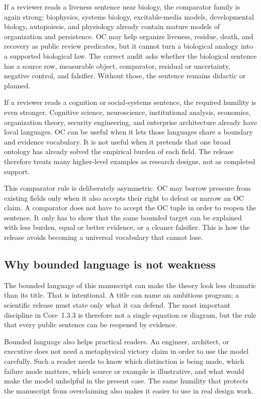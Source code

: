 If a reviewer reads a liveness sentence near biology, the comparator family is
again strong: biophysics, systems biology, excitable-media models,
developmental biology, autopoiesis, and physiology already contain mature
models of organization and persistence. OC may help organize liveness,
residue, death, and recovery as public review predicates, but it cannot turn a
biological analogy into a supported biological law. The correct audit asks
whether the biological sentence has a source row, measurable object,
comparator, residual or uncertainty, negative control, and falsifier. Without
those, the sentence remains didactic or planned.

If a reviewer reads a cognition or social-systems sentence, the required
humility is even stronger. Cognitive science, neuroscience, institutional
analysis, economics, organization theory, security engineering, and enterprise
architecture already have local languages. OC can be useful when it lets those
languages share a boundary and evidence vocabulary. It is not useful when it
pretends that one broad ontology has already solved the empirical burden of
each field. The release therefore treats many higher-level examples as
research designs, not as completed support.

This comparator rule is deliberately asymmetric. OC may borrow pressure from
existing fields only when it also accepts their right to defeat or narrow an OC
claim. A comparator does not have to accept the OC tuple in order to reopen the
sentence. It only has to show that the same bounded target can be explained
with less burden, equal or better evidence, or a cleaner falsifier. This is how
the release avoids becoming a universal vocabulary that cannot lose.

\subsection{Why bounded language is not weakness}

The bounded language of this manuscript can make the theory look less dramatic
than its title. That is intentional. A title can name an ambitious program; a
scientific release must state only what it can defend. The most important
discipline in Core~1.3.3 is therefore not a single equation or diagram, but
the rule that every public sentence can be reopened by evidence.

Bounded language also helps practical readers. An engineer, architect, or
executive does not need a metaphysical victory claim in order to use the model
carefully. Such a reader needs to know which distinction is being made, which
failure mode matters, which source or example is illustrative, and what would
make the model unhelpful in the present case. The same humility that protects
the manuscript from overclaiming also makes it easier to use in real design
work.

